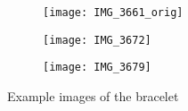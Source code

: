 \documentclass[12pt]{IIBproject}
\begin{document}
\begin{figure}[H]
\centering
\begin{subfigure}{.33\textwidth}
  \centering
  \texttt{[image: IMG\_3661\_orig]}
  \label{fig:sub1}
\end{subfigure}%
\begin{subfigure}{.33\textwidth}
  \centering
  \texttt{[image: IMG\_3672]}
  \label{fig:sub2}
\end{subfigure}
\begin{subfigure}{.33\textwidth}
  \centering
  \texttt{[image: IMG\_3679]}
  \label{fig:sub2}
\end{subfigure}
\caption{Example images of the bracelet}
\label{fig:test}
\end{figure}
\end{document}
